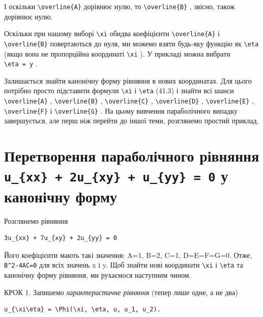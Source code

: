 \documentclass[
  ukrainian,
]{article}
\begin{document}
І оскільки \texttt{\textbackslash{}overline\{A\}} дорівнює нулю, то
\texttt{\textbackslash{}overline\{B\}} , звісно, також дорівнює нулю.

Оскільки при нашому виборі \texttt{\textbackslash{}xi} обидва
коефіцієнти \texttt{\textbackslash{}overline\{A\}} і
\texttt{\textbackslash{}overline\{B\}} повертаються до нуля, ми можемо
взяти будь-яку функцію як \texttt{\textbackslash{}eta} (якщо вона не
пропорційна координаті \texttt{\textbackslash{}xi} ). У прикладі можна
вибрати \texttt{\textbackslash{}eta\ =\ y} .

Залишається знайти канонічну форму рівняння в нових координатах. Для
цього потрібно просто підставити формули \texttt{\textbackslash{}xi} і
\texttt{\textbackslash{}eta} (41.3) і знайти всі шанси
\texttt{\textbackslash{}overline\{A\}} ,
\texttt{\textbackslash{}overline\{B\}} ,
\texttt{\textbackslash{}overline\{C\}} ,
\texttt{\textbackslash{}overline\{D\}} ,
\texttt{\textbackslash{}overline\{E\}} ,
\texttt{\textbackslash{}overline\{F\}} і
\texttt{\textbackslash{}overline\{G\}} . На цьому вивчення параболічного
випадку завершується, але перш ніж перейти до іншої теми, розглянемо
простий приклад.

\section{\texorpdfstring{Перетворення параболічного рівняння
\texttt{u\_\{xx\}\ +\ 2u\_\{xy\}\ +\ u\_\{yy\}\ =\ 0} у канонічну
форму}{Перетворення параболічного рівняння u\_\{xx\} + 2u\_\{xy\} + u\_\{yy\} = 0 у канонічну форму}}\label{ux43fux435ux440ux435ux442ux432ux43eux440ux435ux43dux43dux44f-ux43fux430ux440ux430ux431ux43eux43bux456ux447ux43dux43eux433ux43e-ux440ux456ux432ux43dux44fux43dux43dux44f-u_xx-2u_xy-u_yy-0-ux443-ux43aux430ux43dux43eux43dux456ux447ux43dux443-ux444ux43eux440ux43cux443}

Розглянемо рівняння

\begin{verbatim}
3u_{xx} + 7u_{xy} + 2u_{yy} = 0
\end{verbatim}

Його коефіцієнти мають такі значення: A=1, B=2, C=1, D=E=F=G=0. Отже,
\texttt{B\^{}2-4AC=0} для всіх значень x і y. Щоб знайти нові координати
\texttt{\textbackslash{}xi} і \texttt{\textbackslash{}eta} та канонічну
форму рівняння, ми рухаємося наступним чином.

КРОК 1. Запишемо \emph{характеристичне рівняння} (тепер лише одне, а не
два)

\begin{verbatim}
u_{\xi\eta} = \Phi(\xi, \eta, u, u_1, u_2).
\end{verbatim}
\end{document}
